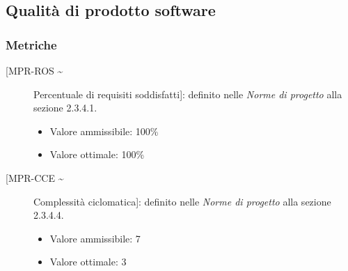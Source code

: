 \documentclass[../piano-di-qualifica.tex]{subfiles}
\begin{document}
\subsection{Qualità di prodotto software}

\subsubsection{Metriche}%
\label{subs:metriche_funzionale}
\begin{description}
\item [[MPR-ROS \textasciitilde] Percentuale di requisiti soddisfatti]: definito nelle \textit{Norme di progetto} alla sezione 2.3.4.1.
\begin{itemize} \item Valore ammissibile: 100\% \item Valore ottimale: 100\% \end{itemize}
\item [[MPR-CCE \textasciitilde] Complessità ciclomatica]: definito nelle \textit{Norme di progetto} alla sezione 2.3.4.4.
  \begin{itemize} \item Valore ammissibile: \leq{}  7 \item Valore ottimale: \leq{}  3 \end{itemize}
\end{description}


\end{document}
